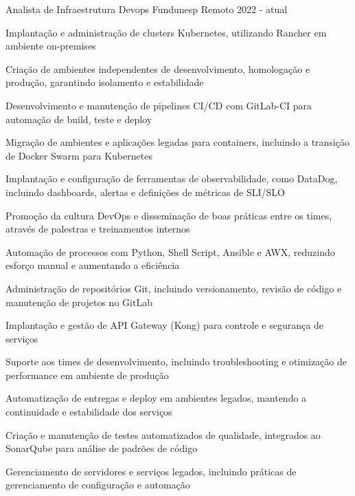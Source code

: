 

\begin{cventries}


\cventry
{Analista de Infraestrutura Devops} %
{Fundunesp} %
{Remoto} %
{2022 - atual} %
{
  \begin{cvitems}
    \item {Implantação e administração de clusters Kubernetes, utilizando Rancher em ambiente on-premises}
    \item {Criação de ambientes independentes de desenvolvimento, homologação e produção, garantindo isolamento e estabilidade}
    \item {Desenvolvimento e manutenção de pipelines CI/CD com GitLab-CI para automação de build, teste e deploy}
    \item {Migração de ambientes e aplicações legadas para containers, incluindo a transição de Docker Swarm para Kubernetes}
    \item {Implantação e configuração de ferramentas de observabilidade, como DataDog, incluindo dashboards, alertas e definições de métricas de SLI/SLO}
    \item {Promoção da cultura DevOps e disseminação de boas práticas entre os times, através de palestras e treinamentos internos}
    \item {Automação de processos com Python, Shell Script, Ansible e AWX, reduzindo esforço manual e aumentando a eficiência}
    \item {Administração de repositórios Git, incluindo versionamento, revisão de código e manutenção de projetos no GitLab}
    \item {Implantação e gestão de API Gateway (Kong) para controle e segurança de serviços}
    \item {Suporte aos times de desenvolvimento, incluindo troubleshooting e otimização de performance em ambiente de produção}
    \item {Automatização de entregas e deploy em ambientes legados, mantendo a continuidade e estabilidade dos serviços}
    \item {Criação e manutenção de testes automatizados de qualidade, integrados ao SonarQube para análise de padrões de código}
    \item {Gerenciamento de servidores e serviços legados, incluindo práticas de gerenciamento de configuração e automação}
  \end{cvitems}
}


\end{cventries}
